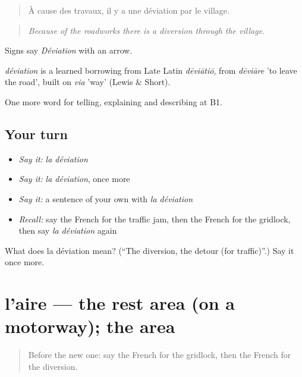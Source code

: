 \begin{quote}
À cause des travaux, il y a une déviation par le village.
\end{quote}

\begin{quote}
\emph{Because of the roadworks there is a diversion through the village.}
\end{quote}

Signs say \emph{Déviation} with an arrow.

\begin{cousinweb}
\emph{déviation} is a learned borrowing from Late Latin \emph{dēviātiō}, from \emph{dēviāre} 'to leave the road', built on \emph{via} 'way' (Lewis \& Short).
\end{cousinweb}

\begin{grammarlens}[title={What you've built}]
One more word for telling, explaining and describing at B1.
\end{grammarlens}

\subsection*{Your turn}
\begin{itemize}
\raggedright
  \item \emph{Say it:} \emph{la déviation}
  \item \emph{Say it:} \emph{la déviation}, once more
  \item \emph{Say it:} a sentence of your own with \emph{la déviation}
  \item \emph{Recall:} say the French for the traffic jam, then the French for the gridlock, then say \emph{la déviation} again
\end{itemize}

\begin{tcolorbox}[breakable,colback=teal!4,colframe=teal!35!black,title={Before you move on}]
What does la déviation mean? (\textquotedblleft{}The diversion, the detour (for traffic)\textquotedblright{}.) Say it once more.
\end{tcolorbox}
\section[l'aire]{l'aire — the rest area (on a motorway); the area}

\label{lesson:FR-C410-aire}



\begin{quote}
Before the new one: say the French for the gridlock, then the French for the diversion.
\end{quote}

